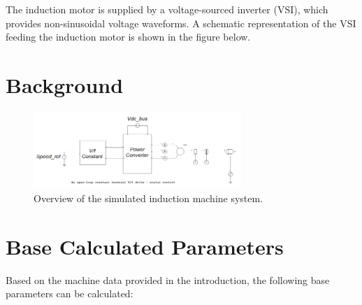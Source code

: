 \documentclass[12pt,a4paper]{report}
\begin{document}
The induction motor is supplied by a voltage-sourced inverter (VSI), which provides non-sinusoidal voltage waveforms. A schematic representation of the VSI feeding the induction motor is shown in the figure below.
\newpage
\section{Background}
\begin{figure}[h!]
    \centering
    \includegraphics[width=0.7\textwidth]{OverviewSim.png}
    \caption{Overview of the simulated induction machine system.}
\label{fig:overview-sim}
\end{figure}
\section{Base Calculated Parameters}
\label{sec:base-parameters}

Based on the machine data provided in the introduction, the following base parameters can be calculated:
\end{document}
